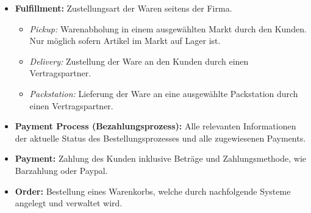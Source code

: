 \begin{itemize}
	\item \textbf{Fulfillment: } {Zustellungsart der Waren seitens der Firma.}
	\begin{itemize}[noitemsep,nolistsep]
		\item \textit{Pickup: } {Warenabholung in einem ausgewählten Markt durch den Kunden. Nur möglich sofern Artikel im Markt auf Lager ist.}
		\item \textit{Delivery: } {Zustellung der Ware an den Kunden durch einen Vertragspartner.}
		\item \textit{Packstation: } {Lieferung der Ware an eine ausgewählte Packstation durch einen Vertragspartner.}
	\end{itemize}
	\item \textbf{Payment Process (Bezahlungsprozess): } {Alle relevanten Informationen der aktuelle Status des Bestellungsprozesses und alle zugewiesenen Payments.}
	\item \textbf{Payment: } {Zahlung des Kunden inklusive Beträge und Zahlungsmethode, wie Barzahlung oder Paypal.}
	\item \textbf{Order: } {Bestellung eines Warenkorbs, welche durch nachfolgende Systeme angelegt und verwaltet wird.}
\end{itemize}
\vspace{0.4em}

